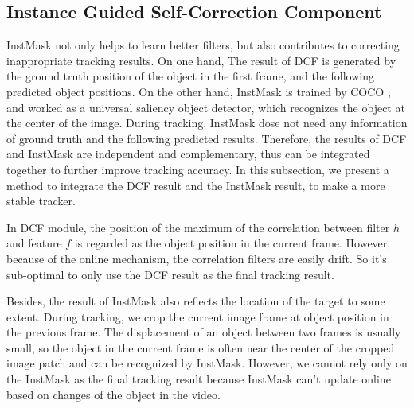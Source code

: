 \documentclass[review]{elsarticle}
\begin{document}
\subsection{Instance Guided Self-Correction Component} \label{sec:cog}
InstMask not only helps to learn better filters, but also contributes to correcting inappropriate tracking results. On one hand, The result of DCF is generated by the ground truth position of the object in the first frame, and the following predicted object positions. On the other hand,  InstMask is trained by COCO \cite{Lin2014MicrosoftCC}, and worked as a universal saliency object detector, which recognizes the object at the center of the image. During tracking, InstMask dose not need any information of ground truth and the following predicted results. Therefore, the results of DCF and InstMask are independent and complementary, thus can be integrated together to further improve tracking accuracy. In this subsection, we present a method to integrate the DCF result and the InstMask result, to make a more stable tracker.

In DCF module, the position of the maximum of the correlation between filter $h$ and feature $f$ is regarded as the object position in the current frame. However, because of the online mechanism, the correlation filters are easily drift. So it's sub-optimal to only use the DCF result as the final tracking result.

Besides, the result of InstMask also reflects the location of the target to some extent. During tracking, we crop the current image frame at object position in the previous frame. The displacement of an object between two frames is usually small, so the object in the current frame is often near the center of the cropped image patch and can be recognized by InstMask. However, we cannot rely only on the InstMask as the final tracking result because InstMask can't update online based on changes of the object in the video.
\end{document}
